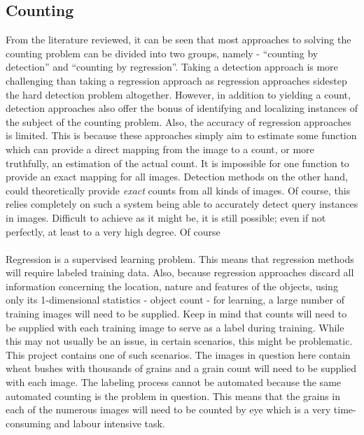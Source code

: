 \subsection{Counting}
From the literature reviewed, it can be seen that most approaches to solving the counting problem can be divided into two groups, namely - ``counting by detection'' and ``counting by regression''. Taking a detection approach is more challenging than taking a regression approach as regression approaches sidestep the hard detection problem altogether. However, in addition to yielding a count, detection approaches also offer the bonus of identifying and localizing instances of the subject of the counting problem. Also, the accuracy of regression approaches is limited. This is because these approaches simply aim to estimate some function which can provide a direct mapping from the image to a count, or more truthfully, an estimation of the actual count. It is impossible for one function to provide an exact mapping for all images. Detection methods on the other hand, could theoretically provide \textit{exact} counts from all kinds of images. Of course, this relies completely on such a system being able to accurately detect query instances in images. Difficult to achieve as it might be, it is still possible; even if not perfectly, at least to a very high degree. Of course\\ \\
%
Regression is a supervised learning problem. This means that regression methods will require labeled training data. Also, because regression approaches discard all information concerning the location, nature and features of the objects, using only its 1-dimensional statistics - object count - for learning, a large number of training images will need to be supplied. Keep in mind that counts will need to be supplied with each training image to serve as a label during training. While this may not usually be an issue, in certain scenarios, this might be problematic. This project contains one of such scenarios. The images in question here contain wheat bushes with thousands of grains and a grain count will need to be supplied with each image. The labeling process cannot be automated because the same automated counting is the problem in question. This means that the grains in each of the numerous images will need to be counted by eye which is a very time-consuming and labour intensive task.\\ \\
%
